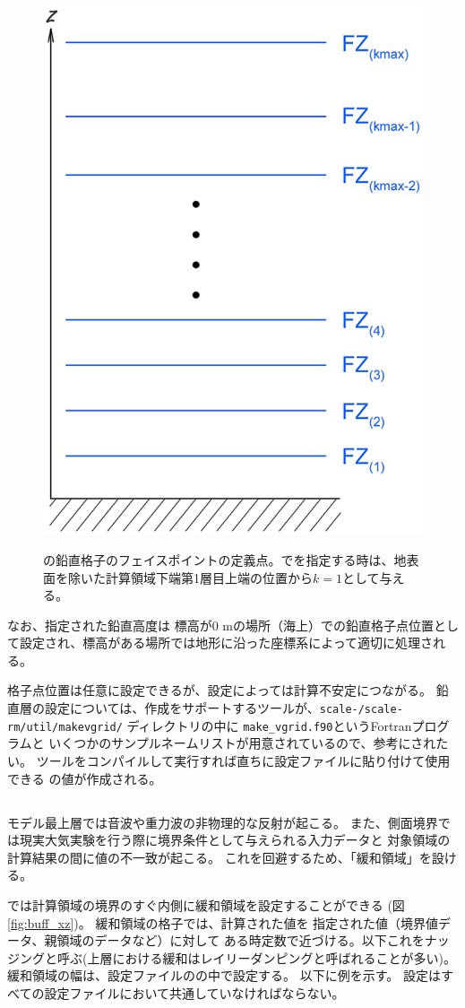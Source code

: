 \begin{figure}[tb]
\begin{center}
  \includegraphics[width=0.4\hsize]{./figure/verticalface.eps}\\
  \caption{\scalerm の鉛直格子のフェイスポイントの定義点。でを指定する時は、地表面を除いた計算領域下端第1層目上端の位置から$k=1$として与える。}
  \label{fig:scale_grid}
\end{center}
\end{figure}

なお、指定された鉛直高度は
標高が0 mの場所（海上）での鉛直格子点位置として設定され、標高がある場所では地形に沿った座標系によって適切に処理される。


格子点位置は任意に設定できるが、設定によっては計算不安定につながる。
鉛直層の設定については、作成をサポートするツールが、\texttt{scale-\version/scale-rm/util/makevgrid/}
ディレクトリの中に \verb|make_vgrid.f90|というFortranプログラムと
いくつかのサンプルネームリストが用意されているので、参考にされたい。
ツールをコンパイルして実行すれば直ちに設定ファイルに貼り付けて使用できる
の値が作成される。


\subsection{\SubsecBasicBufferSetting} \label{subsec:buffer}
モデル最上層では音波や重力波の非物理的な反射が起こる。
また、側面境界では現実大気実験を行う際に境界条件として与えられる入力データと
対象領域の計算結果の間に値の不一致が起こる。
これを回避するため、「緩和領域」を設ける。

\scalerm では計算領域の境界のすぐ内側に緩和領域を設定することができる
(図\ref{fig:buff_xz})。
緩和領域の格子では、計算された値を
指定された値（境界値データ、親領域のデータなど）に対して
ある時定数で近づける。以下これをナッジングと呼ぶ(上層における緩和はレイリーダンピングと呼ばれることが多い)。
緩和領域の幅は、設定ファイルのの中で設定する。
以下に例を示す。
設定はすべての設定ファイルにおいて共通していなければならない。

